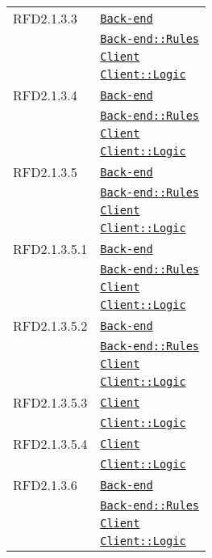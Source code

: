 \begin{longtable}{|>{\centering}m{3cm}|m{10cm}<{\centering}|}
RFD2.1.3.3 & \hyperref[Back-end]{\texttt{Back-end}}\\
& \hyperref[Back-end::Rules]{\texttt{Back-end::Rules}}\\
& \hyperref[Client]{\texttt{Client}}\\
& \hyperref[Client::Logic]{\texttt{Client::Logic}}\\ \hline

RFD2.1.3.4 & \hyperref[Back-end]{\texttt{Back-end}}\\
& \hyperref[Back-end::Rules]{\texttt{Back-end::Rules}}\\
& \hyperref[Client]{\texttt{Client}}\\
& \hyperref[Client::Logic]{\texttt{Client::Logic}}\\ \hline

RFD2.1.3.5 & \hyperref[Back-end]{\texttt{Back-end}}\\
& \hyperref[Back-end::Rules]{\texttt{Back-end::Rules}}\\
& \hyperref[Client]{\texttt{Client}}\\
& \hyperref[Client::Logic]{\texttt{Client::Logic}}\\ \hline

RFD2.1.3.5.1 & \hyperref[Back-end]{\texttt{Back-end}}\\
& \hyperref[Back-end::Rules]{\texttt{Back-end::Rules}}\\
& \hyperref[Client]{\texttt{Client}}\\
& \hyperref[Client::Logic]{\texttt{Client::Logic}}\\ \hline

RFD2.1.3.5.2 & \hyperref[Back-end]{\texttt{Back-end}}\\
& \hyperref[Back-end::Rules]{\texttt{Back-end::Rules}}\\
& \hyperref[Client]{\texttt{Client}}\\
& \hyperref[Client::Logic]{\texttt{Client::Logic}}\\ \hline

RFD2.1.3.5.3 & \hyperref[Client]{\texttt{Client}}\\
& \hyperref[Client::Logic]{\texttt{Client::Logic}}\\ \hline

RFD2.1.3.5.4 & \hyperref[Client]{\texttt{Client}}\\
& \hyperref[Client::Logic]{\texttt{Client::Logic}}\\ \hline

RFD2.1.3.6 & \hyperref[Back-end]{\texttt{Back-end}}\\
& \hyperref[Back-end::Rules]{\texttt{Back-end::Rules}}\\
& \hyperref[Client]{\texttt{Client}}\\
& \hyperref[Client::Logic]{\texttt{Client::Logic}}\\ \hline


\end{longtable}

